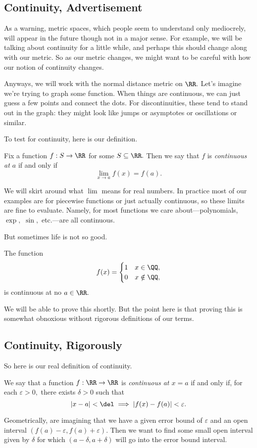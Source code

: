 \documentclass[../notes.tex]{subfiles}
\begin{document}
\subsection{Continuity, Advertisement}
As a warning, metric spaces, which people seem to understand only mediocrely, will appear in the future though not in a major sense. For example, we will be talking about continuity for a little while, and perhaps this should change along with our metric. So as our metric changes, we might want to be careful with how our notion of continuity changes.

Anyways, we will work with the normal distance metric on $\RR.$ Let's imagine we're trying to graph some function. When things are continuous, we can just guess a few points and connect the dots. For discontinuities, these tend to stand out in the graph: they might look like jumps or asymptotes or oscillations or similar.

To test for continuity, here is our definition.
\begin{definition}[Continuity, I]
	Fix a function $f:S\to\RR$ for some $S\subseteq\RR.$ Then we say that $f$ is \textit{continuous at $a$} if and only if
	\[\lim_{x\to a}f(x)=f(a).\]
\end{definition}
We will skirt around what $\lim$ means for real numbers. In practice most of our examples are for piecewise functions or just actually continuous, so these limits are fine to evaluate. Namely, for most functions we care about---polynomials, $\exp,$ $\sin,$ etc.---are all continuous.

But sometimes life is not so good.
\begin{example}
	The function
	\[f(x)=\begin{cases}
		1 & x\in\QQ, \\
		0 & x\notin\QQ,
	\end{cases}\]
	is continuous at no $a\in\RR.$
\end{example}
We will be able to prove this shortly. But the point here is that proving this is somewhat obnoxious without rigorous definitions of our terms.

\subsection{Continuity, Rigorously}
So here is our real definition of continuity.
\begin{definition}[Continuity, II]
	We say that a function $f:\RR\to\RR$ is \textit{continuous at $x=a$} if and only if, for each $\varepsilon>0,$ there exists $\delta>0$ such that
	\[|x-a|<\del\implies|f(x)-f(a)|<\varepsilon.\]
\end{definition}
Geometrically, are imagining that we have a given error bound of $\varepsilon$ and an open interval $(f(a)-\varepsilon,f(a)+\varepsilon).$ Then we want to find some small open interval given by $\delta$ for which $(a-\delta,a+\delta)$ will go into the error bound interval.
\end{document}
